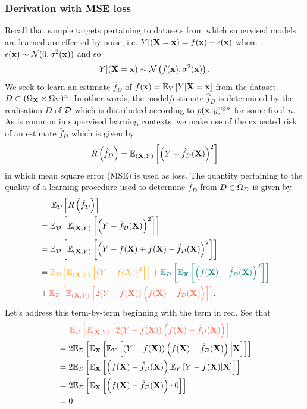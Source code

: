 \documentclass[11pt]{article}
\begin{document}
\subsubsection{Derivation with MSE loss}
Recall that sample targets pertaining to datasets from which supervised models are learned are effected by noise, i.e. $Y|(\mathbf{X}=\mathbf{x})=f(\mathbf{x})+\epsilon(\mathbf{x})$ where $\epsilon(\mathbf{x})\sim\mathcal{N}(0,\sigma^2(\mathbf{x}))$ and so
$$
Y|(\mathbf{X}=\mathbf{x})
\sim
\mathcal{N}\left(f(\mathbf{x}), \sigma^2(\mathbf{x})\right).
$$
We seek to learn an estimate $\hat{f}_{D}$ of $f(\mathbf{x})=\mathbb{E}_Y\left[Y|\mathbf{X}=\mathbf{x}\right]$ from the dataset $D\subset(\Omega_{\mathbf{X}}\times\Omega_Y)^n$. In other words, the model/estimate $\hat{f}_{D}$ is determined by the realisation $D$ of $\mathcal{D}$ which is distributed according to $p(\mathbf{x},y)^{\otimes n}$ for some fixed $n$. As is common in supervised learning contexts, we make use of the expected risk of an estimate $\hat{f}_D$ which is given by
$$
R\left(\hat{f}_D\right)
=
\mathbb{E}_{(\mathbf{X},Y)}\left[\left(Y-\hat{f}_D(\mathbf{X})\right)^2\right]
$$
in which mean square error (MSE) is used as loss. The quantity pertaining to the quality of a learning procedure used to determine $\hat{f}_{D}$ from $D\in\Omega_{\mathcal{D}}$ is given by
\begin{align*}
    &\hspace{14.52pt}
    \E_{\D}\l[R\l(\hat{f}_{\D}\r)\r]\\
    &=
    \E_{\D}\l[\E_{(\X,Y)}\l[\l(Y-\hat{f}_{\D}(\X)\r)^2\r]\r]\nonumber\\
    &=
    \E_{\D}\l[\E_{(\X,Y)}\l[\l(Y-f(\X)+f(\X)-\hat{f}_{\D}(\X)\r)^2\r]\r]\nonumber\\
    &=
    \textcolor{myYellow}{\E_{\D}\l[\E_{(\X,Y)}\l[\l(Y-f(X)\r)^2\r]\r]}+
    \textcolor{myGreen}{\E_{\D}\l[\E_\X\l[\l(f(\X)-\hat{f}_{\D}(\X)\r)^2\r]\r]}\\
    &+\textcolor{myLightRed}{\E_{\D}\l[\E_{(\X,Y)}\l[2(Y-f(\X))\l(f(\X)-\hat{f}_{\D}(\X)\r)\r]\r]}.
\end{align*}
Let's address this term-by-term beginning with the term in red. See that
\begin{align*}
    &\hspace{14.52pt}
    \textcolor{myLightRed}{\E_{\D}\l[\E_{(\X,Y)}\l[2(Y-f(\X))\l(f(\X)-\hat{f}_{\D}(\X)\r)\r]\r]}\\
    &=
    2\E_{\D}\l[\E_\X\l[\E_{Y}\l[(Y-f(\X))\l(f(\X)-\hat{f}_{\D}(\X)\r)\Big|\X\r]\r]\r]\\
    &=
    2\E_{\D}\l[\E_\X\l[\l(f(\X)-\hat{f}_{\D}(\X)\r)\E_{Y}\l[Y-f(\X)\vert\X\r]\r]\r]\\
    &=
    2\E_{\D}\l[\E_\X\l[\l(f(\X)-\hat{f}_{\D}(\X)\r)\cdot0\r]\r]\\
    &=
    0
\end{align*}
\end{document}
